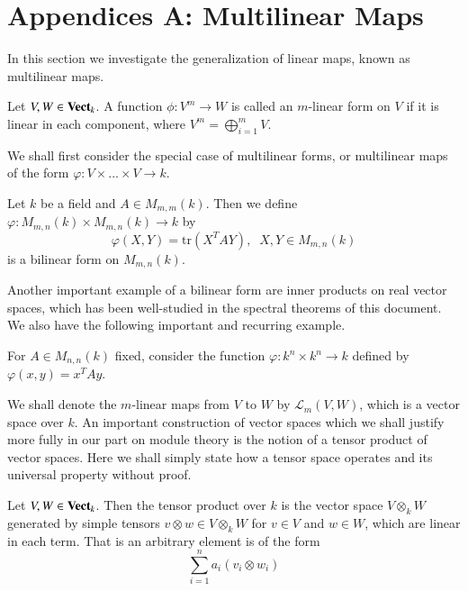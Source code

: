 %
\section*{Appendices A: Multilinear Maps}
%

In this section we investigate the generalization of linear maps, known as multilinear maps.

\begin{definition}
    Let $V,W \in \normalfont\textbf{Vect}_{k}$. A function $\phi:V^m\rightarrow W$ is called an $m$-linear form on $V$ if it is linear in each component, where $V^m = \bigoplus_{i=1}^mV$.
\end{definition}

We shall first consider the special case of multilinear forms, or multilinear maps of the form $\varphi:V\times ...\times V\rightarrow k$.

\begin{example}
    Let $k$ be a field and $A \in M_{m,m}(k)$. Then we define $\varphi:M_{m,n}(k)\times M_{m,n}(k)\rightarrow k$ by \begin{equation*}
        \varphi(X,Y) = \text{tr}(X^TAY),\;\;X,Y \in M_{m,n}(k)
    \end{equation*}
    is a bilinear form on $M_{m,n}(k)$.
\end{example}

Another important example of a bilinear form are inner products on real vector spaces, which has been well-studied in the spectral theorems of this document. We also have the following important and recurring example.

\begin{example}
    For $A \in M_{n,n}(k)$ fixed, consider the function $\varphi:k^n\times k^n\rightarrow k$ defined by $\varphi(x,y) = x^TAy$.
\end{example}

We shall denote the $m$-linear maps from $V$ to $W$ by $\mathcal{L}_m(V,W)$, which is a vector space over $k$. An important construction of vector spaces which we shall justify more fully in our part on module theory is the notion of a tensor product of vector spaces. Here we shall simply state how a tensor space operates and its universal property without proof.

\begin{definition}
    Let $V,W \in \normalfont\textbf{Vect}_{k}$. Then the tensor product over $k$ is the vector space $V\otimes_kW$ generated by simple tensors $v\otimes w \in V\otimes_kW$ for $v \in V$ and $w \in W$, which are linear in each term. That is an arbitrary element is of the form \begin{equation*}
        \sum_{i=1}^na_i(v_i\otimes w_i)
    \end{equation*}
\end{definition}

